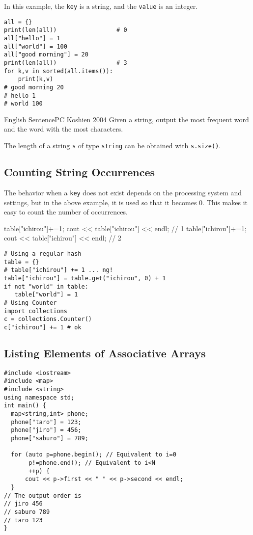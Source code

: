 In this example, the \texttt{key} is a string, and the \texttt{value} is an integer.

\begin{pybox}
\begin{verbatim}
all = {}
print(len(all))                 # 0
all["hello"] = 1
all["world"] = 100
all["good morning"] = 20
print(len(all))                 # 3
for k,v in sorted(all.items()):
    print(k,v)
# good morning 20
# hello 1
# world 100
\end{verbatim}
\end{pybox}

\begin{psbox}{English Sentence}{PC Koshien 2004}
Given a string, output the most frequent word and the word with the most characters.

\end{psbox}


The length of a string \texttt{s} of type \texttt{string} can be obtained with \texttt{s.size()}.
\subsection{Counting String Occurrences}

The behavior when a \texttt{key} does not exist depends on the processing system and settings, but in the above example, it is used so that it becomes 0.
This makes it easy to count the number of occurrences.

\begin{cbox}
  table["ichirou"]+=1;
  cout << table["ichirou"] << endl; // 1
  table["ichirou"]+=1;
  cout << table["ichirou"] << endl; // 2
\end{cbox}

\begin{pybox}
\begin{verbatim}
# Using a regular hash
table = {}  
# table["ichirou"] += 1 ... ng!
table["ichirou"] = table.get("ichirou", 0) + 1
if not "world" in table:
   table["world"] = 1
# Using Counter
import collections
c = collections.Counter()
c["ichirou"] += 1 # ok
\end{verbatim}
\end{pybox}
\subsection{Listing Elements of Associative Arrays}

\begin{c11box}[emph={map,iterator,begin,end,first,second}]
\begin{verbatim}
#include <iostream>
#include <map>
#include <string>
using namespace std;
int main() {
  map<string,int> phone;
  phone["taro"] = 123;
  phone["jiro"] = 456;
  phone["saburo"] = 789;

  for (auto p=phone.begin(); // Equivalent to i=0
       p!=phone.end(); // Equivalent to i<N
       ++p) {
      cout << p->first << " " << p->second << endl;
  }
// The output order is
// jiro 456
// saburo 789
// taro 123
}
\end{verbatim}
\end{c11box}

